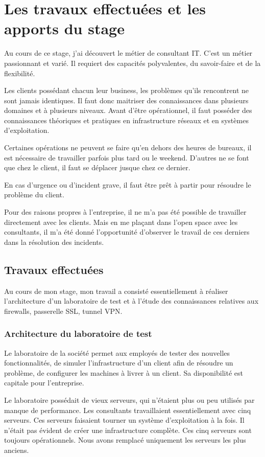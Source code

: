 \chapter{Les travaux effectuées et les apports du stage}
Au cours de ce stage, j'ai découvert le métier de consultant IT.
C'est un métier passionnant et varié.
Il requiert des capacités polyvalentes, du savoir-faire et de la flexibilité.

Les clients possédant chacun leur business, les problèmes qu'ils rencontrent ne sont jamais identiques.
Il faut donc maitriser des connaissances dans plusieurs domaines et à plusieurs niveaux.
Avant d'être opérationnel, il faut posséder des connaissances théoriques et pratiques en infrastructure réseaux et en systèmes d'exploitation.

Certaines opérations ne peuvent se faire qu'en dehors des heures de bureaux, il est nécessaire de travailler parfois plus tard ou le weekend. 
D'autres ne se font que chez le client, il faut se déplacer jusque chez ce dernier.

En cas d'urgence ou d'incident grave, il faut être prêt à partir pour résoudre le problème du client. 

Pour des raisons propres à l'entreprise, il ne m'a pas été possible de travailler directement avec les clients.
Mais en me plaçant dans l'open space avec les consultants, il m'a été donné l'opportunité d'observer le travail de ces derniers dans la résolution des incidents.

\section{Travaux effectuées}
Au cours de mon stage, mon travail a consisté essentiellement à réaliser l'architecture d'un laboratoire de test et à l'étude des connaissances relatives aux firewalls, passerelle SSL, tunnel VPN.

\subsection{Architecture du laboratoire de test}
Le laboratoire de la société permet aux employés de tester des nouvelles fonctionnalités, de simuler l'infrastructure d'un client afin de résoudre un problème, de configurer les machines à livrer à un client.
Sa disponibilité est capitale pour l'entreprise.

Le laboratoire possédait de vieux serveurs, qui n'étaient plus ou peu utilisés par manque de performance.
Les consultants travaillaient essentiellement avec cinq serveurs.
Ces serveurs faisaient tourner un système d'exploitation à la fois.
Il n'était pas évident de créer une infrastructure complète.
Ces cinq serveurs sont toujours opérationnels.
Nous avons remplacé uniquement les serveurs les plus anciens.

